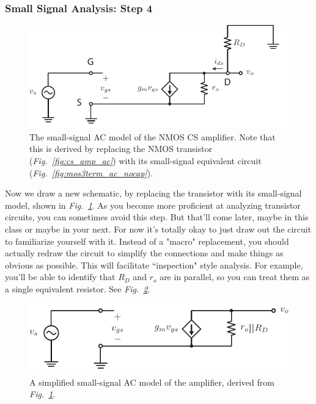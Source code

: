 \subsubsection{Small Signal Analysis:  Step 4}
\begin{figure}[tb]
\centering
\includegraphics[scale=1]{cs_amp_ss1}
\caption{The small-signal AC model of the NMOS CS amplifier. Note that this is derived by replacing the NMOS transistor (\emph{Fig.~\ref{fig:cs_amp_ac}}) with its small-signal equivalent circuit (\emph{Fig.~\ref{fig:mos3term_ac_nocap}}).}
\label{fig:cs_amp_ss1}
\end{figure}
Now we draw a new schematic, by replacing the transistor with its small-signal model, shown in \emph{Fig.~\ref{fig:cs_amp_ss1}}.  As you become more proficient at analyzing transistor circuits, you can sometimes avoid this step. But that'll come later, maybe in this class or maybe in your next.  For now it's totally okay to just draw out the circuit to familiarize yourself with it.
Instead of a "macro" replacement, you should actually redraw the circuit to simplify the connections and make things as obvious as possible. This will facilitate ``inspection" style analysis. For example, you'll be able to identify that $R_D$ and $r_o$ are in parallel, so you can treat them as a single equivalent resistor.  See \emph{Fig.~\ref{fig:cs_amp_ss2}}.
\begin{figure}[tb]
\centering
\includegraphics[scale=1]{cs_amp_ss2}
\caption{A simplified small-signal AC model of the amplifier, derived from \emph{Fig.~\ref{fig:cs_amp_ss1}}.} \label{fig:cs_amp_ss2}
\end{figure}
